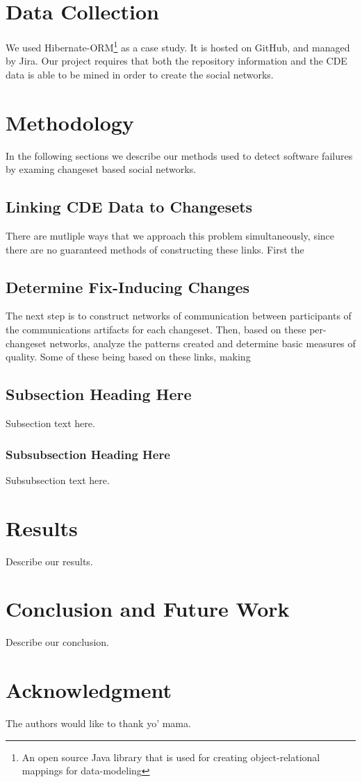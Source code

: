\documentclass[conference]{IEEEtran}
\begin{document}
\section{Data Collection}
We used Hibernate-ORM\footnote{An open source Java library that is used for creating object-relational mappings for data-modeling} as a case study.  It is hosted on GitHub, and managed by Jira\footnotemark[2].  Our project requires that both the repository information and the CDE data is able to be mined in order to create the social networks. 

\section{Methodology}
In the following sections we describe our methods used to detect software failures by examing changeset based social networks.

\subsection{Linking CDE Data to Changesets}
There are mutliple ways that we approach this problem simultaneously, since there are no guaranteed methods of constructing these links.  First the    


\subsection{Determine Fix-Inducing Changes}

The next step is to construct networks of communication between participants of the communications artifacts for each changeset.  Then, based on these per-changeset networks, analyze the patterns created and determine basic measures of quality.  Some of these being based on these links, making  

\subsection{Subsection Heading Here}
Subsection text here.

\subsubsection{Subsubsection Heading Here}
Subsubsection text here.


\section{Results}
Describe our results.


\section{Conclusion and Future Work}
Describe our conclusion.


\section*{Acknowledgment}
The authors would like to thank yo' mama.





\end{document}
